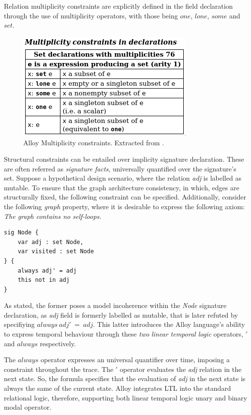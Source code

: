Relation multiplicity constraints are explicitly defined in the field declaration through the use of multiplicity operators, with those being $one$, $lone$, $some$ and $set$.

\begin{figure}[H]
    \centering
    \includegraphics[width=0.4\linewidth]{images/alloy_multiplicity.png}
    \caption{Alloy Multiplicity constraints. Extracted from \cite{alloy-qr}.} 
    \label{fig:alloy-multiplicity}
\end{figure}


Structural constraints can be entailed over implicity signature declaration. These are often referred as \textit{signature facts}, universally quantified over the signature's set. \cite{alloy-qr} Suppose a hypothetical design scenario, where the relation \textit{adj} is labelled as mutable. To ensure that the graph architecture consistency, in which, edges are structurally fixed, the following constraint can be specified. Additionally, consider the following \textit{graph} property, where it is desirable to express the following axiom: \textit{The graph contains no self-loops.}

\begin{lstlisting}[title={\textit{Node} hypothetical constraints over the signature definition.}, otherkeywords = {abstract, sig, module, var, set, fact, extends, no, in, this, not, always, \', \=}, floatplacement=H]
sig Node {
    var adj : set Node, 
    var visited : set Node
} {
    always adj' = adj
    this not in adj
}
\end{lstlisting}

As stated, the former poses a model incoherence within the \textit{Node} signature declaration, as \textit{adj} field is formerly labelled as mutable, that is later refuted by specifiying $always \ adj'\ =\ adj$. This latter introduces the Alloy language's ability to express temporal behaviour through these \textit{two} \textit{linear temporal logic} operators, $'$ and $always$ respectively. 

The $always$ operator expresses an universal quantifier over time, imposing a constraint throughout the trace. The $'$ operator evaluates the \textit{adj} relation in the next state. So, the formula specifies that the evaluation of \textit{adj} in the next state is always the same of the current state. Alloy integrates LTL into the standard relational logic, therefore, supporting both linear temporal logic unary and binary modal operator.

